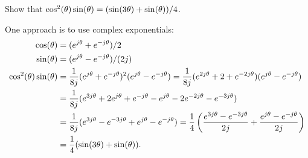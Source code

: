 \documentclass[a4paper]{amsart}
\renewenvironment{solution}{\SolutionInline}{\endSolutionInline}
\begin{document}
\begin{exercise}
 Show that $\cos^2(\theta)\sin(\theta)=(\sin(3\theta)+\sin(\theta))/4$.
\end{exercise}
\begin{solution}
 One approach is to use complex exponentials:
 \begin{align*}
  \cos(\theta) &= (e^{j\theta}+e^{-j\theta})/2 \\
  \sin(\theta) &= (e^{j\theta}-e^{-j\theta})/(2j) \\
  \cos^2(\theta)\sin(\theta) &= 
   \frac{1}{8j} (e^{j\theta}+e^{-j\theta})^2(e^{j\theta}-e^{-j\theta}) 
    = \frac{1}{8j} (e^{2j\theta}+2+e^{-2j\theta})(e^{j\theta}-e^{-j\theta}) \\
   &= \frac{1}{8j} (e^{3j\theta}+2e^{j\theta}+e^{-j\theta}
                    -e^{j\theta}-2e^{-2j\theta}-e^{-3j\theta}) \\
   &= \frac{1}{8j} (e^{3j\theta}-e^{-3j\theta}+e^{j\theta}-e^{-j\theta})
    = \frac{1}{4}\left(\frac{e^{3j\theta}-e^{-3j\theta}}{2j} + 
                       \frac{e^{j\theta}-e^{-j\theta}}{2j}\right) \\
   &= \frac{1}{4}(\sin(3\theta)+\sin(\theta)).
 \end{align*}
\end{solution}
\end{document}
